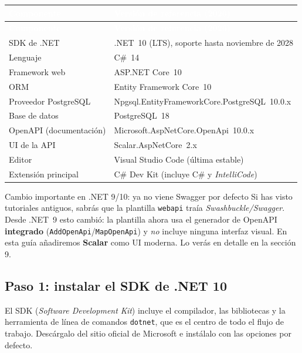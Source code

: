\documentclass[11pt]{article}
\begin{document}
{\renewcommand{\arraystretch}{1.2}
\begin{longtable}{>{\raggedright\arraybackslash}p{5.6cm} >{\raggedright\arraybackslash}p{9.8cm}}
\rowcolor{netmorado}\textcolor{white}{\textbf{Componente}} & \textcolor{white}{\textbf{Versión de referencia (2026)}} \\
\endfirsthead
\rowcolor{netmorado}\textcolor{white}{\textbf{Componente}} & \textcolor{white}{\textbf{Versión de referencia (2026)}} \\
\endhead
SDK de .NET & .NET~10 (LTS), soporte hasta noviembre de 2028 \\ \hline
Lenguaje & C\#~14 \\ \hline
Framework web & ASP.NET Core~10 \\ \hline
ORM & Entity Framework Core~10 \\ \hline
Proveedor PostgreSQL & Npgsql.EntityFrameworkCore.PostgreSQL~10.0.x \\ \hline
Base de datos & PostgreSQL~18 \\ \hline
OpenAPI (documentación) & Microsoft.AspNetCore.OpenApi~10.0.x \\ \hline
UI de la API & Scalar.AspNetCore~2.x \\ \hline
Editor & Visual Studio Code (última estable) \\ \hline
Extensión principal & C\# Dev Kit (incluye C\# y \emph{IntelliCode}) \\ \hline
\end{longtable}}

\begin{cajawarn}{Cambio importante en .NET 9/10: ya no viene Swagger por defecto}
Si has visto tutoriales antiguos, sabrás que la plantilla \texttt{webapi} traía \emph{Swashbuckle/Swagger}. Desde .NET~9 esto cambió: la plantilla ahora usa el generador de OpenAPI \textbf{integrado} (\texttt{AddOpenApi}/\texttt{MapOpenApi}) y \emph{no} incluye ninguna interfaz visual. En esta guía añadiremos \textbf{Scalar} como UI moderna. Lo verás en detalle en la sección 9.\par
\end{cajawarn}

\subsection{Paso 1: instalar el SDK de .NET 10}
El SDK (\emph{Software Development Kit}) incluye el compilador, las bibliotecas y la herramienta de línea de comandos \texttt{dotnet}, que es el centro de todo el flujo de trabajo. Descárgalo del sitio oficial de Microsoft e instálalo con las opciones por defecto.
\end{document}

